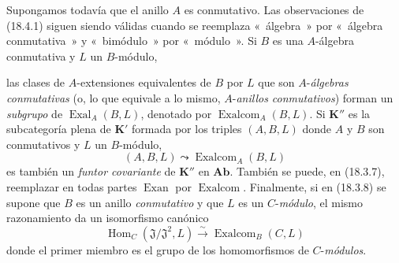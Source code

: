 \begin{env}[18.4.2]
\label{0.18.4.2-es}
Supongamos todavía que el anillo $A$ es conmutativo. Las observaciones de (18.4.1) siguen
siendo válidas cuando se reemplaza «~álgebra~» por «~álgebra conmutativa~» y
«~bimódulo~» por «~módulo~». Si $B$ es una $A$-álgebra conmutativa y $L$ un
$B$-módulo,


las clases de $A$-extensiones equivalentes de $B$ por $L$ que son
$A$-\emph{álgebras conmutativas} (o, lo que equivale a lo mismo,
$A$-\emph{anillos conmutativos}) forman un \emph{subgrupo} de
$\operatorname{Exal}_A(B,L)$, denotado por $\operatorname{Exalcom}_A(B,L)$. Si
$\boldsymbol{K}''$ es la subcategoría plena de $\boldsymbol{K}'$ formada por los triples
$(A,B,L)$ donde $A$ y $B$ son conmutativos y $L$ un $B$-módulo,
\[
  (A,B,L)\leadsto\operatorname{Exalcom}_A(B,L)
\]
es también un \emph{funtor covariante} de $\boldsymbol{K}''$ en $\boldsymbol{Ab}$. También se
puede, en (18.3.7), reemplazar en todas partes $\operatorname{Exan}$ por
$\operatorname{Exalcom}$. Finalmente, si en (18.3.8) se supone que $B$ es un
anillo \emph{conmutativo} y que $L$ es un $C$-\emph{módulo}, el mismo
razonamiento da un isomorfismo canónico
\begin{equation}
\label{0.18.4.2.1-es}
\tag{18.4.2.1}
  \operatorname{Hom}_C(\mathfrak J/\mathfrak J^2,L)
  \xrightarrow{\sim}\operatorname{Exalcom}_B(C,L)
\end{equation}
donde el primer miembro es el grupo de los homomorfismos de $C$-\emph{módulos}.
\end{env}

